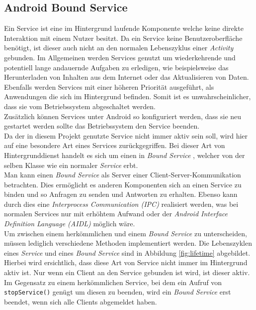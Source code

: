 \documentclass[]{report}
\begin{document}
\subsection{Android Bound Service}
Ein Service ist eine im Hintergrund laufende Komponente welche keine direkte Interaktion mit einem Nutzer besitzt. Da ein Service keine Benutzeroberfläche benötigt, ist dieser auch nicht an den normalen Lebenszyklus einer \textit{Activity} gebunden. Im Allgemeinen werden Services genutzt um wiederkehrende und potentiell lange andauernde Aufgaben zu erledigen, wie beispielsweise das Herunterladen von Inhalten aus dem Internet oder das Aktualisieren von Daten. Ebenfalls werden Services mit einer höheren Priorität ausgeführt, als Anwendungen die sich im Hintergrund befinden. Somit ist es unwahrscheinlicher, dass sie vom Betriebssystem abgeschaltet werden. \\
Zusätzlich können Services unter Android so konfiguriert werden, dass sie neu gestartet werden sollte das Betriebssystem den Service beenden. \\
Da der in diesem Projekt genutzte Service nicht immer aktiv sein soll, wird hier auf eine besondere Art eines Services zurückgegriffen. Bei dieser Art von Hintergrunddienst handelt es sich um einen in \textit{Bound Service} \cite{BoundService}, welcher von der selben Klasse wie ein normaler \textit{Service} erbt. \\
Man kann einen \textit{Bound Service} als Server einer Client-Server-Kommunikation betrachten. Dies ermöglicht es anderen Komponenten sich an einen Service zu binden und so Anfragen zu senden und Antworten zu erhalten. Ebenso kann durch dies eine \textit{Interprocess Communication (IPC)} realisiert werden, was bei normalen Services nur mit erhöhtem Aufwand oder der \textit{Android Interface Definition Language (AIDL)} möglich wäre. \\
Um zwischen einem herkömmlichen und einem \textit{Bound Service} zu unterscheiden, müssen lediglich verschiedene Methoden implementiert werden. Die Lebenszyklen eines \textit{Service} und eines \textit{Bound Service} sind in Abbildung \ref{fig:lifetime} abgebildet. \\
Hierbei wird ersichtlich, dass diese Art von Service nicht immer im Hintergrund aktiv ist. Nur wenn ein Client an den Service gebunden ist wird, ist dieser aktiv. Im Gegensatz zu einem herkömmlichen Service, bei dem ein Aufruf von \texttt{stopService()} genügt um diesen zu beenden, wird ein \textit{Bound Service} erst beendet, wenn sich alle Clients abgemeldet haben.
\end{document}
